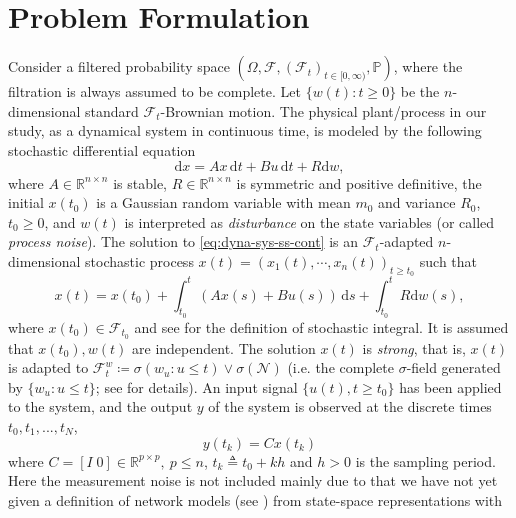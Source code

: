 \documentclass[letterpaper,10pt,journal,final]{IEEEtran}
\theoremstyle{definition}
\theoremstyle{remark}
\begin{document}
\section{Problem Formulation}
\label{sec:problem-formulation}

Consider a filtered probability space
$(\Omega, \mathcal{F}, (\mathcal{F}_t)_{t \in [0, \infty)}, \mathbb{P})$, where the
filtration is always assumed to be complete.  Let $\{w(t): t \geq 0\}$ be the
$n$-dimensional standard $\mathcal{F}_t$-Brownian motion.
The physical plant/process in our study, as a dynamical
system in continuous time, is modeled by the following stochastic differential
equation
\begin{equation}
  \label{eq:dyna-sys-ss-cont}
  \mathrm{d}x = Ax\,\mathrm{d}t + Bu\,\mathrm{d}t + R \mathrm{d}w,
\end{equation}
where $A \in \mathbb{R}^{n \times n}$ is stable, $R \in \mathbb{R}^{n \times n}$ is
symmetric and positive definitive, the initial $x(t_0)$ is a
Gaussian random variable with mean $m_0$ and variance $R_0$, $t_0 \geq 0$, and $w(t)$ is interpreted
as \emph{disturbance} on the state variables (or called \emph{process noise}).  The solution
to \eqref{eq:dyna-sys-ss-cont} is an $\mathcal{F}_t$-adapted $n$-dimensional
stochastic process $x(t) = (x_1(t), \cdots, x_n(t))_{t \geq t_0}$ such that
\begin{equation*}
  x(t) = x(t_0) + \int_{t_0}^t \left( A x(s) + B u(s)  \right)\, \mathrm{d}s + \int_{t_0}^t R \mathrm{d} w(s),
\end{equation*}
where $x(t_0) \in \mathcal{F}_{t_0}$ and see \cite{Gall2016} for the definition of
stochastic integral. It is assumed that $x(t_0), w(t)$ are independent. The solution
$x(t)$ is \emph{strong}, that is, $x(t)$ is adapted to
$\mathcal{F}_t^w \coloneqq \sigma(w_u\! :\! u\!\leq\! t) \vee \sigma(\mathcal{N})$
(i.e. the complete $\sigma$-field generated by $\{w_u\!:\! u\!\leq\!  t\}$; see
\cite{Gall2016} for details).  An input signal $\{u(t), t \geq t_0\}$ has been
applied to the system, and the output $y$ of the system is observed at the discrete
times $t_0, t_1, ..., t_N$,
\begin{equation}
  \label{eq:dyna-sys-ss-output}
  y(t_k) = C x(t_k)
\end{equation}
where $C = [I\; 0] \in \mathbb{R}^{p \times p},\ p \!\leq\! n$,
$t_k \triangleq t_0 + kh$ and $h > 0$ is the sampling period. Here the measurement
noise is not included mainly due to that we have not yet given a definition of
network models (see \cite{Goncalves2008}) from state-space representations with
\end{document}

